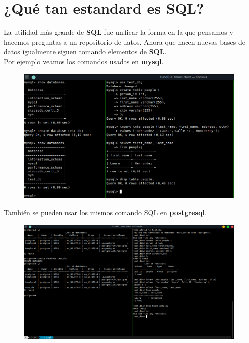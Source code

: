 \documentclass{article}
\begin{document}
\section{¿Qué tan estandard es SQL?}%
La utilidad más grande de \textbf{SQL} fue unificar la forma en la que pensamos
y hacemos preguntas a un repositorio de datos. Ahora que nacen nuevas bases de
datos igualmente siguen tomando elementos de \textbf{SQL}.\\

Por ejemplo veamos los comandos usados en \textbf{mysql}.
\begin{figure}[h!]
  \centering
  \includegraphics[scale=0.75]{./Pictures/065_mysql.png}
\end{figure}

\newpage

También se pueden usar los mismos comando SQL en \textbf{postgresql}.
\begin{figure}[h!]
  \centering
  \includegraphics[scale=0.50]{./Pictures/066_postgresql.png}
\end{figure}

\end{document}
